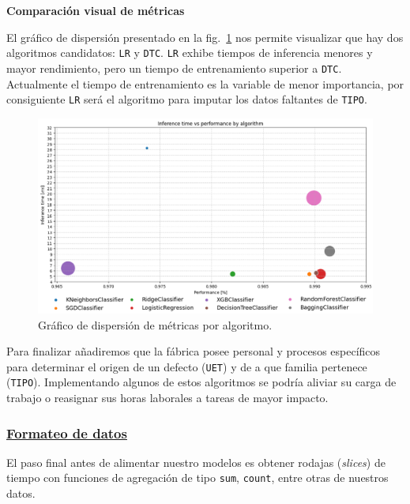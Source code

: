 \documentclass[a4paper,12pt]{article}
\begin{document}
		\textbf{Comparación visual de métricas}
		
		El gráfico de dispersión presentado en la fig.~\ref{fig:inference_training_perfo_uet} nos permite visualizar que hay dos algoritmos candidatos: \texttt{LR} y \texttt{DTC}. \texttt{LR} exhibe tiempos de inferencia menores y mayor rendimiento, pero un tiempo de entrenamiento superior a \texttt{DTC}. Actualmente el tiempo de entrenamiento es la variable de menor importancia, por consiguiente \texttt{LR} será el algoritmo para imputar los datos faltantes de \texttt{TIPO}.
		
		\begin{figure}[H]
			\begin{center}
				\includegraphics[width=1\textwidth]{inference_training_perfo_uet.png}
				\caption{Gráfico de dispersión de métricas por algoritmo.}
				\label{fig:inference_training_perfo_uet}
			\end{center}
		\end{figure}
		
		Para finalizar añadiremos que la fábrica posee personal y procesos específicos para determinar el origen de un defecto (\texttt{UET}) y de a que familia pertenece (\texttt{TIPO}). Implementando algunos de estos algoritmos se podría aliviar su carga de trabajo o  reasignar sus horas laborales a tareas de mayor impacto.
		
		\subsubsection{\href{https://github.com/GeraCollante/tesis-icomp-machinelearning/blob/main/DataFormatting.ipynb}{\color{blue}Formateo de datos}}\label{DataFormatting}
		
		El paso final antes de alimentar nuestro modelos es obtener rodajas (\textit{slices}) de tiempo con funciones de agregación de tipo \texttt{sum}, \texttt{count}, entre otras de nuestros datos. 
		
\end{document}
